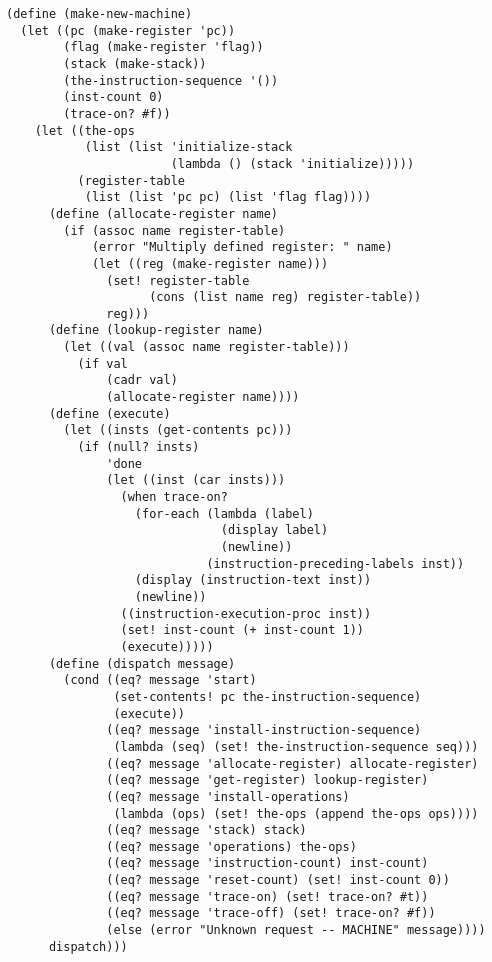 \documentclass[a4paper,12pt]{article}
\begin{document}
\begin{lstlisting}
(define (make-new-machine)
  (let ((pc (make-register 'pc))
        (flag (make-register 'flag))
        (stack (make-stack))
        (the-instruction-sequence '())
        (inst-count 0)
        (trace-on? #f))
    (let ((the-ops
           (list (list 'initialize-stack
                       (lambda () (stack 'initialize)))))
          (register-table
           (list (list 'pc pc) (list 'flag flag))))
      (define (allocate-register name)
        (if (assoc name register-table)
            (error "Multiply defined register: " name)
            (let ((reg (make-register name)))
              (set! register-table
                    (cons (list name reg) register-table))
              reg)))
      (define (lookup-register name)
        (let ((val (assoc name register-table)))
          (if val
              (cadr val)
              (allocate-register name))))
      (define (execute)
        (let ((insts (get-contents pc)))
          (if (null? insts)
              'done
              (let ((inst (car insts)))
                (when trace-on?
                  (for-each (lambda (label)
                              (display label)
                              (newline))
                            (instruction-preceding-labels inst))
                  (display (instruction-text inst))
                  (newline))
                ((instruction-execution-proc inst))
                (set! inst-count (+ inst-count 1))
                (execute)))))
      (define (dispatch message)
        (cond ((eq? message 'start)
               (set-contents! pc the-instruction-sequence)
               (execute))
              ((eq? message 'install-instruction-sequence)
               (lambda (seq) (set! the-instruction-sequence seq)))
              ((eq? message 'allocate-register) allocate-register)
              ((eq? message 'get-register) lookup-register)
              ((eq? message 'install-operations)
               (lambda (ops) (set! the-ops (append the-ops ops))))
              ((eq? message 'stack) stack)
              ((eq? message 'operations) the-ops)
              ((eq? message 'instruction-count) inst-count)
              ((eq? message 'reset-count) (set! inst-count 0))
              ((eq? message 'trace-on) (set! trace-on? #t))
              ((eq? message 'trace-off) (set! trace-on? #f))
              (else (error "Unknown request -- MACHINE" message))))
      dispatch)))
\end{lstlisting}
\end{document}
